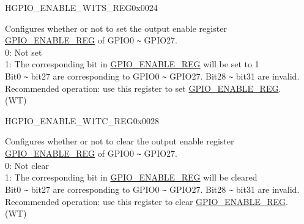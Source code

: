 \begin{register}{H}{GPIO\_ENABLE\_W1TS\_REG}{0x0024}\label{regdesc:GPIOENABLEW1TSREG}
%
\regnewline%
\begin{regdesc}\begin{reglist}
\label{fielddesc:GPIOENABLEW1TS}\item [GPIO\_ENABLE\_W1TS] Configures whether or not to set the output enable register \hyperref[regdesc:GPIOENABLEREG]{GPIO\_ENABLE\_REG} of GPIO0 \verb+~+ GPIO27.\\
0: Not set\\
1: The corresponding bit in \hyperref[regdesc:GPIOENABLEREG]{GPIO\_ENABLE\_REG} will be set to 1\\
Bit0 \verb+~+ bit27 are corresponding to GPIO0 \verb+~+ GPIO27. Bit28 \verb+~+ bit31 are invalid.
Recommended operation: use this register to set \hyperref[regdesc:GPIOENABLEREG]{GPIO\_ENABLE\_REG}.\\
(WT)
\end{reglist}\end{regdesc}
\end{register}


\begin{register}{H}{GPIO\_ENABLE\_W1TC\_REG}{0x0028}\label{regdesc:GPIOENABLEW1TCREG}
%
\regnewline%
\begin{regdesc}\begin{reglist}
\label{fielddesc:GPIOENABLEW1TC}\item [GPIO\_ENABLE\_W1TC] Configures whether or not to clear the output enable register \hyperref[regdesc:GPIOENABLEREG]{GPIO\_ENABLE\_REG} of GPIO0 \verb+~+ GPIO27. \\
0: Not clear\\
1: The corresponding bit in \hyperref[regdesc:GPIOENABLEREG]{GPIO\_ENABLE\_REG} will be cleared\\
Bit0 \verb+~+ bit27 are corresponding to GPIO0 \verb+~+ GPIO27. Bit28 \verb+~+ bit31 are invalid.
Recommended operation: use this register to clear \hyperref[regdesc:GPIOENABLEREG]{GPIO\_ENABLE\_REG}.\\
(WT)
\end{reglist}\end{regdesc}
\end{register}

